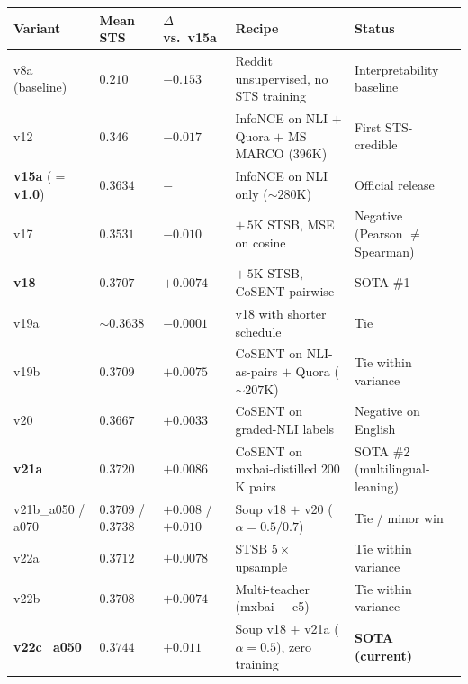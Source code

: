 \documentclass[
  11pt]{article}
\newcounter{none} %
\begin{document}
{\def\LTcaptype{none} %
\begin{longtable}[]{@{}
  >{\raggedright\arraybackslash}p{}
  >{\raggedright\arraybackslash}p{}
  >{\raggedright\arraybackslash}p{}
  >{\raggedright\arraybackslash}p{}
  >{\raggedright\arraybackslash}p{}@{}}
\toprule\noalign{}
\begin{minipage}[b]{\linewidth}\raggedright
Variant
\end{minipage} & \begin{minipage}[b]{\linewidth}\raggedright
Mean STS
\end{minipage} & \begin{minipage}[b]{\linewidth}\raggedright
\(\Delta\) vs.~v15a
\end{minipage} & \begin{minipage}[b]{\linewidth}\raggedright
Recipe
\end{minipage} & \begin{minipage}[b]{\linewidth}\raggedright
Status
\end{minipage} \\
\midrule\noalign{}
\endhead
\bottomrule\noalign{}
\endlastfoot
v8a (baseline) & \(0.210\) & \(-0.153\) & Reddit unsupervised, no STS
training & Interpretability baseline \\
v12 & \(0.346\) & \(-0.017\) & InfoNCE on NLI \(+\) Quora \(+\) MS MARCO
(\(396\)K) & First STS-credible \\
\textbf{v15a} (\(=\) \textbf{v1.0}) & \(0.3634\) & \(-\) & InfoNCE on
NLI only (\(\sim 280\)K) & Official release \\
v17 & \(0.3531\) & \(-0.010\) & \(+\,5\)K STSB, MSE on cosine & Negative
(Pearson \(\neq\) Spearman) \\
\textbf{v18} & \(0.3707\) & \(+0.0074\) & \(+\,5\)K STSB, CoSENT
pairwise & SOTA \#1 \\
v19a & \(\sim 0.3638\) & \(-0.0001\) & v18 with shorter schedule &
Tie \\
v19b & \(0.3709\) & \(+0.0075\) & CoSENT on NLI-as-pairs \(+\) Quora
(\(\sim 207\)K) & Tie within variance \\
v20 & \(0.3667\) & \(+0.0033\) & CoSENT on graded-NLI labels & Negative
on English \\
\textbf{v21a} & \(0.3720\) & \(+0.0086\) & CoSENT on mxbai-distilled
\(200\)K pairs & SOTA \#2 (multilingual-leaning) \\
v21b\_a050 / a070 & \(0.3709\) / \(0.3738\) & \(+0.008\) / \(+0.010\) &
Soup v18 \(+\) v20 (\(\alpha = 0.5/0.7\)) & Tie / minor win \\
v22a & \(0.3712\) & \(+0.0078\) & STSB \(5\times\) upsample & Tie within
variance \\
v22b & \(0.3708\) & \(+0.0074\) & Multi-teacher (mxbai \(+\) e5) & Tie
within variance \\
\textbf{v22c\_a050} & \(0.3744\) & \(+0.011\) & Soup v18 \(+\) v21a
(\(\alpha = 0.5\)), zero training & \textbf{SOTA (current)} \\
\end{longtable}
}
\end{document}
